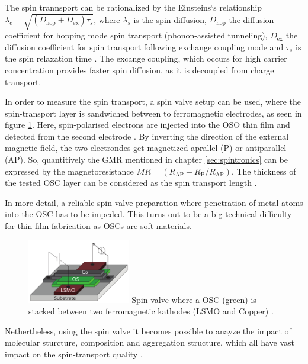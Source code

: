 The spin trannsport can be rationalized by the Einsteins`s relationship $\lambda_e = \sqrt{(D_\text{hop} + D_\text{ex})\tau_s}$,
where $\lambda_s$ is the spin diffusion, $D_\text{hop}$ the diffusion coefficient for hopping mode spin transport (phonon-assisted tunneling), $D_\text{ex}$ the diffusion coefficient for spin transport following exchange coupling mode and $\tau_s$ is the spin relaxation time \cite{perovskite}.
The excange coupling, which occurs for high carrier concentration provides faster spin diffusion, as it is decoupled from charge transport.


In order to measure the spin transport, a spin valve setup can be used, where the spin-transport layer is sandwiched between to ferromagnetic electrodes, as seen in figure \ref{fig:valve}.
Here, spin-polarised electrons are injected into the OSO thin film and detected from the second electrode \cite{appl-organic}.
By inverting the direction of the external magnetic field, the two electrondes get magnetized aprallel (P) or antiparallel (AP).
So, quantitively the GMR mentioned in chapter \ref{sec:spintronics} can be expressed by the magnetoresistance $MR = (R_\text{AP}-R_\text{P}/R_\text{AP})$.
The thickness of the tested OSC layer can be considered as the spin transport length \cite{appl-organic}.

In more detail, a reliable spin valve preparation where penetration of metal atoms into the OSC has to be impeded.
This turns out to be a big technical difficulty for thin film fabrication as OSCs are soft materials. 

\begin{figure}
    \centering
  \captionsetup{width=0.7\linewidth}
  \includegraphics[width=0.4\textwidth]{graphics/valve.png}
  {Spin valve where a OSC (green) is stacked between two ferromagnetic kathodes (LSMO and Copper) \cite{valve}.}
  \label{fig:valve}
\end{figure}

Nethertheless, using the spin valve it becomes possible to anayze the impact of molecular sturcture, composition and aggregation structure, which all have vast impact on the spin-transport quality \cite{appl-organic}.


